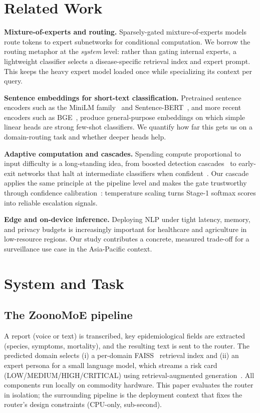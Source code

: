 \documentclass[runningheads]{llncs}
\begin{document}
\section{Related Work}
\textbf{Mixture-of-experts and routing.} Sparsely-gated mixture-of-experts
models~\cite{shazeer2017} route tokens to expert subnetworks for conditional
computation. We borrow the routing metaphor at the \emph{system} level: rather
than gating internal experts, a lightweight classifier selects a disease-specific
retrieval index and expert prompt. This keeps the heavy expert model loaded once
while specializing its context per query.

\textbf{Sentence embeddings for short-text classification.} Pretrained sentence
encoders such as the MiniLM family~\cite{wang2020minilm} and
Sentence-BERT~\cite{reimers2019sbert}, and more recent encoders such as
BGE~\cite{xiao2023bge}, produce general-purpose embeddings on which simple linear
heads are strong few-shot classifiers. We quantify how far this gets us on a
domain-routing task and whether deeper heads help.

\textbf{Adaptive computation and cascades.} Spending compute proportional to
input difficulty is a long-standing idea, from boosted detection
cascades~\cite{viola2001cascade} to early-exit networks that halt at intermediate
classifiers when confident~\cite{teerapittayanon2016branchynet}. Our cascade
applies the same principle at the pipeline level and makes the gate trustworthy
through confidence calibration~\cite{guo2017calibration}: temperature scaling
turns Stage-1 softmax scores into reliable escalation signals.

\textbf{Edge and on-device inference.} Deploying NLP under tight latency, memory,
and privacy budgets is increasingly important for healthcare and agriculture in
low-resource regions. Our study contributes a concrete, measured trade-off for a
surveillance use case in the Asia-Pacific context.

\section{System and Task}
\subsection{The ZoonoMoE pipeline}
A report (voice or text) is transcribed, key epidemiological fields are extracted
(species, symptoms, mortality), and the resulting text is sent to the router. The
predicted domain selects (i) a per-domain FAISS~\cite{johnson2019faiss} retrieval
index and (ii) an expert persona for a small language model, which streams a risk
card (LOW/MEDIUM/HIGH/CRITICAL) using retrieval-augmented
generation~\cite{lewis2020rag}. All components run locally on commodity hardware.
This paper evaluates the router in isolation; the surrounding pipeline is the
deployment context that fixes the router's design constraints (CPU-only, sub-second).
\end{document}

